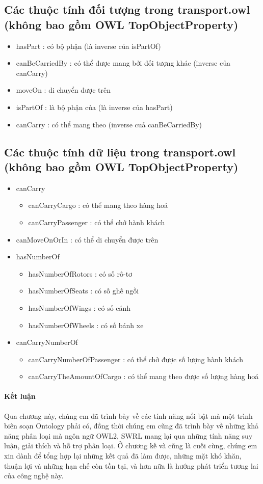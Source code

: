 \subsection{Các thuộc tính đối tượng trong transport.owl (không bao gồm OWL TopObjectProperty)}
\begin{itemize}
\item hasPart : có bộ phận (là inverse của isPartOf)
\item canBeCarriedBy : có thể được mang bởi đối tượng khác (inverse của canCarry)
\item moveOn : di chuyển được trên
\item isPartOf : là bộ phận của (là inverse của hasPart)
\item canCarry : có thể mang theo (inverse cuả canBeCarriedBy)
\end{itemize}
\subsection{Các thuộc tính dữ liệu trong transport.owl (không bao gồm OWL TopObjectProperty)}
\begin{itemize}
	\item canCarry
	\begin{itemize}
		\item canCarryCargo : có thể mang theo hàng hoá
		\item canCarryPassenger : có thể chở hành khách
	\end{itemize}
	\item canMoveOnOrIn : có thể di chuyển được trên
	\item hasNumberOf
	\begin{itemize}
		\item hasNumberOfRotors : có số rô-tơ
		\item hasNumberOfSeats : có số ghế ngồi
		\item hasNumberOfWings : có số cánh
		\item hasNumberOfWheels : có số bánh xe
	\end{itemize}
	\item canCarryNumberOf
	\begin{itemize}
	\item canCarryNumberOfPassenger : có thể chở được số lượng hành khách
	\item canCarryTheAmountOfCargo : có thể mang theo được số lượng hàng hoá
	\end{itemize}		
\end{itemize}

\paragraph{Kết luận} Qua chương này, chúng em đã trình bày về các tính năng nổi bật mà một trình biên soạn Ontology phải có, đồng thời chúng em cũng đã trình bày về những khả năng phân loại mà ngôn ngữ OWL2, SWRL mang lại qua những tính năng suy luận, giải thích và hỗ trợ phân loại. Ở chương kế và cũng là cuối cùng, chúng em xin dành để tổng hợp lại những kết quả đã làm được, những mặt khó khăn, thuận lợi và những hạn chế còn tồn tại, và hơn nữa là hướng phát triển tương lai của công nghệ này.



